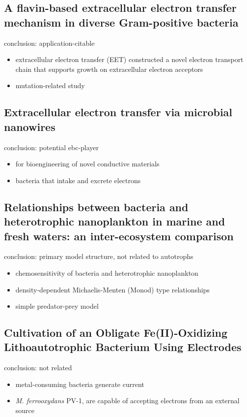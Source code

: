 \documentclass[a4paper,11pt]{article}
\begin{document}
    \subsection{A flavin-based extracellular electron transfer mechanism in diverse Gram-positive bacteria}
    conclusion\autocite{light2018flavin}: application-citable
    \begin{itemize}
        \item extracellular electron transfer (EET) constructed a novel electron transport chain that supports growth on extracellular electron acceptors
        \item mutation-related study
    \end{itemize}
    
    \subsection{Extracellular electron transfer via microbial nanowires}
    conclusion\autocite{reguera2005extracellular}: potential ebc-player
    \begin{itemize}
        \item for bioengineering of novel conductive materials
        \item bacteria that intake and excrete electrons
    \end{itemize}
    
    \subsection{Relationships between bacteria and heterotrophic nanoplankton in marine and fresh waters: an inter-ecosystem comparison}
    conclusion\autocite{sanders1992relationships}: primary model structure, not related to autotrophs
    \begin{itemize}
        \item chemosensitivity of bacteria and heterotrophic nanoplankton
        \item density-dependent Michaelis-Menten (Monod) type relationships
        \item simple predator-prey model
    \end{itemize}
    
    \subsection{Cultivation of an Obligate Fe(II)-Oxidizing Lithoautotrophic Bacterium Using Electrodes}
    conclusion\autocite{summers2013cultivation}: not related
    \begin{itemize}
        \item metal-consuming bacteria generate current
        \item \textit{M. ferrooxydans} PV-1, are capable of accepting electrons from an external source
    \end{itemize}
    
\end{document}
